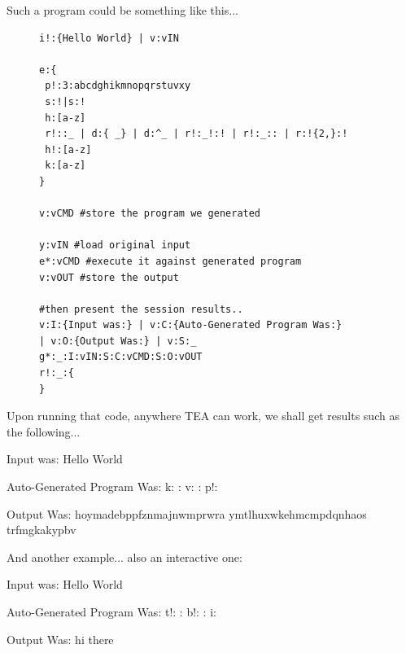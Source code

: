 \documentclass[a4paper, 18pt]{book} %
\begin{document}
\vspace{1em}

Such a program could be something like this...


 \begin{figure}[H]
 \Large
  \begin{tcolorbox}[teaterminalstyle, title=TEA Program: SELF-MODIFYING HELLO WORLD]
  \begin{lstlisting}[language=TEA]
i!:{Hello World} | v:vIN

e:{
 p!:3:abcdghikmnopqrstuvxy
 s:!|s:!
 h:[a-z]
 r!::_ | d:{ _} | d:^_ | r!:_!:! | r!:_:: | r:!{2,}:!
 h!:[a-z]
 k:[a-z]
}

v:vCMD #store the program we generated

y:vIN #load original input
e*:vCMD #execute it against generated program
v:vOUT #store the output

#then present the session results..
v:I:{Input was:} | v:C:{Auto-Generated Program Was:} 
| v:O:{Output Was:} | v:S:_
g*:_:I:vIN:S:C:vCMD:S:O:vOUT
r!:_:{
}
   \end{lstlisting}
  \end{tcolorbox}
  \label{FIGD}
\end{figure}


Upon running that code, anywhere TEA can work, we shall get results such as the following...


  \begin{tcbverbatim}[title=Sample Session of Self-Modifying TEA Hello World]
Input was:
Hello World


Auto-Generated Program Was:
k: :
v: :
p!:


Output Was:
hoymadebppfznmajnwmprwra ymtlhuxwkehmcmpdqnhaos trfmgkakypbv  
  \end{tcbverbatim}



And another example... also an interactive one:




  \begin{tcbverbatim}[title=Sample Session of Self-Modifying TEA Hello World]
Input was:
Hello World


Auto-Generated Program Was:
t!: :
b!: :
i:


Output Was:
hi there 
  \end{tcbverbatim}
\end{document}

